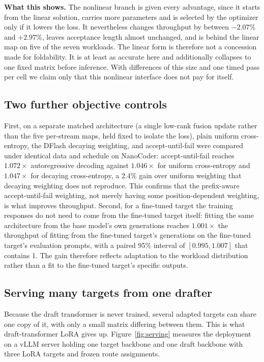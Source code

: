 \textbf{What this shows.} The nonlinear branch is given every advantage, since it starts from the linear solution, carries more parameters and is selected by the optimizer only if it lowers the loss. It nevertheless changes throughput by between $-2.07\%$ and $+2.97\%$, leaves acceptance length almost unchanged, and is behind the linear map on five of the seven workloads. The linear form is therefore not a concession made for foldability. It is at least as accurate here and additionally collapses to one fixed matrix before inference. With differences of this size and one timed pass per cell we claim only that this nonlinear interface does not pay for itself.

\subsection{Two further objective controls}
\label{app:objective-extra}
First, on a separate matched architecture (a single low-rank fusion update rather than the five per-stream maps, held fixed to isolate the loss), plain uniform cross-entropy, the DFlash decaying weighting, and accept-until-fail were compared under identical data and schedule on NanoCoder: accept-until-fail reaches $1.072\times$ autoregressive decoding against $1.046\times$ for uniform cross-entropy and $1.047\times$ for decaying cross-entropy, a $2.4\%$ gain over uniform weighting that decaying weighting does not reproduce. This confirms that the prefix-aware accept-until-fail weighting, not merely having some position-dependent weighting, is what improves throughput. Second, for a fine-tuned target the training responses do not need to come from the fine-tuned target itself: fitting the same architecture from the base model's own generations reaches $1.001\times$ the throughput of fitting from the fine-tuned target's generations on the fine-tuned target's evaluation prompts, with a paired 95\% interval of $[0.995, 1.007]$ that contains 1. The gain therefore reflects adaptation to the workload distribution rather than a fit to the fine-tuned target's specific outputs.

\subsection{Serving many targets from one drafter}
\label{sec:serving}
Because the draft transformer is never trained, several adapted targets can share one copy of it, with only a small matrix differing between them. This is what draft-transformer LoRA gives up. Figure~\ref{fig:serving} measures the deployment on a vLLM server holding one target backbone and one draft backbone with three LoRA targets and frozen route assignments.

